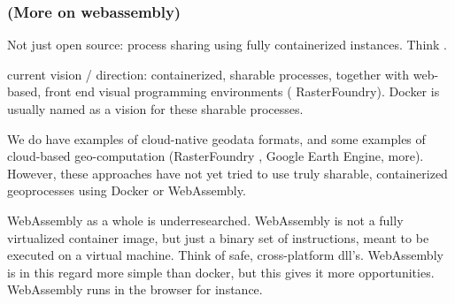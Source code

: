 



\subsubsection{(More on webassembly)}

Not just open source: process sharing using fully containerized instances. Think .

current vision / direction: containerized, sharable processes, together with web-based, front end visual programming environments ( RasterFoundry). Docker is usually named as a vision for these sharable processes.

\m{->} We do have examples of cloud-native geodata formats, and some examples of cloud-based geo-computation (RasterFoundry , Google Earth Engine, more). However, these approaches have not yet tried to use truly sharable, containerized geoprocesses using Docker or WebAssembly. 

\m{->} WebAssembly as a whole is underresearched. WebAssembly is not a fully virtualized container image, but just a binary set of instructions, meant to be executed on a virtual machine. Think of safe, cross-platform dll's. 
WebAssembly is in this regard more simple than docker, but this gives it more opportunities. 
WebAssembly runs in the browser for instance. 


